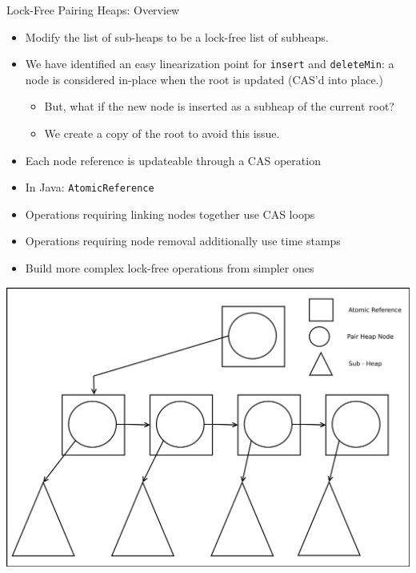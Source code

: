 \documentclass{beamer}
\begin{document}
\begin{frame}{Lock-Free Pairing Heaps: Overview}
  \begin{itemize}
    \item Modify the list of sub-heaps to be a lock-free list of subheaps.
    \item We have identified an easy linearization point for \texttt{insert} and \texttt{deleteMin}:
      a node is considered in-place when the root is updated (CAS'd into place.)
      \begin{itemize}
        \item But, what if the new node is inserted as a subheap of the current root?
        \item We create a copy of the root to avoid this issue.
      \end{itemize}
    \item Each node reference is updateable through a CAS operation
    \item In Java: \texttt{AtomicReference}
    \item Operations requiring linking nodes together use CAS loops
    \item Operations requiring node removal additionally use time stamps
    \item Build more complex lock-free operations from simpler ones
  \end{itemize}
  \includegraphics[scale=1.0]{img/pairheapLockFree.svg}
\end{frame}
\end{document}
